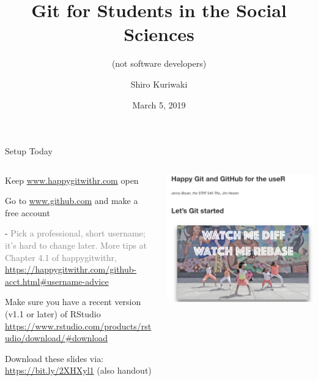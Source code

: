 \documentclass[ignorenonframetext, 10pt, aspectratio=169]{beamer}
\title{\textbf{\Large{Git for Students in the Social Sciences}}}
\subtitle{(not software developers)}
\author{Shiro Kuriwaki}
\date{March 5, 2019}
\begin{document}
\begin{frame}{Setup Today}
\begin{columns}[T]
\begin{column}{0.6\textwidth}
\begin{wideenumerate}
\item Keep  \url{www.happygitwithr.com} open
\item Go to \url{www.github.com} and make a free account
\begin{wideitemize}
\item[-] \textcolor{gray}{\footnotesize Pick a professional, short username; it's hard to change later. More tips at Chapter 4.1 of happygitwithr,  \url{https://happygitwithr.com/github-acct.html\#username-advice}}
\end{wideitemize}
\item Make sure you have a recent version (v1.1 or later) of RStudio \url{https://www.rstudio.com/products/rstudio/download/\#download}
\item Download these slides via: \url{https://bit.ly/2XHXyl1} (also handout)
\end{wideenumerate}
\end{column}
\begin{column}{0.4\textwidth}
\includegraphics[width = \linewidth]{happygit.png}
\end{column}
\end{columns}
\end{frame}
\end{document}
